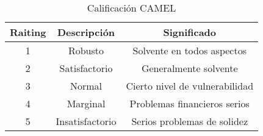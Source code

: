 \begin{table}[h!]

\centering
\caption{Calificación CAMEL}

\begin{tabular}{|c|c|c|}
\hline
\textbf{Raiting} & \textbf{Descripción} & \textbf{Significado}            \\ \hline
1                & Robusto              & Solvente en todos aspectos      \\ \hline
2                & Satisfactorio        & Generalmente solvente           \\ \hline
3                & Normal               & Cierto nivel de vulnerabilidad  \\ \hline
4                & Marginal             & Problemas financieros serios    \\ \hline
5                & Insatisfactorio      & Serios problemas de solidez \\ \hline
\end{tabular}
\end{table}